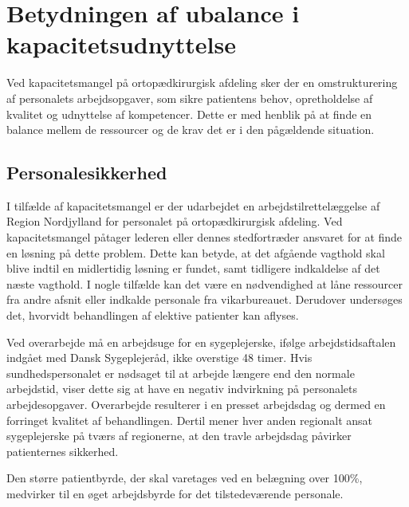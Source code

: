 \section{Betydningen af ubalance i kapacitetsudnyttelse}
Ved kapacitetsmangel på ortopædkirurgisk afdeling sker der en omstrukturering af personalets arbejdsopgaver, som sikre patientens behov, opretholdelse af kvalitet og udnyttelse af kompetencer. Dette er med henblik på at finde en balance mellem de ressourcer og de krav det er i den pågældende situation. \cite{Bjerg2016}  %

\subsection{Personalesikkerhed} \label{Per_sik}

I tilfælde af kapacitetsmangel er der udarbejdet en arbejdstilrettelæggelse af Region Nordjylland for personalet på ortopædkirurgisk afdeling. Ved kapacitetsmangel påtager lederen eller dennes stedfortræder ansvaret for at finde en løsning på dette problem. Dette kan betyde, at det afgående vagthold skal blive indtil en midlertidig løsning er fundet, samt  tidligere indkaldelse af det næste vagthold. I nogle tilfælde kan det være en nødvendighed at låne ressourcer fra andre afsnit eller indkalde personale fra vikarbureauet. Derudover undersøges det, hvorvidt behandlingen af elektive patienter kan aflyses.\cite{Bjerg2016} 

Ved overarbejde må en arbejdsuge for en sygeplejerske, ifølge arbejdstidsaftalen indgået med Dansk Sygeplejeråd, ikke overstige 48 timer\cite{Danske2015}.  Hvis sundhedspersonalet er nødsaget til at arbejde længere end den normale arbejdstid, viser dette sig at have en negativ indvirkning på personalets arbejdesopgaver.\cite{Dinges2004} Overarbejde resulterer i en presset arbejdsdag og dermed en forringet kvalitet af behandlingen. Dertil mener hver anden regionalt ansat sygeplejerske på tværs af regionerne, at den travle arbejdsdag påvirker patienternes sikkerhed.\cite{Kjeldsen2015} 

Den større patientbyrde, der skal varetages ved en belægning over 100\%, medvirker til en øget arbejdsbyrde for det tilstedeværende personale. \cite{Dinges2004,Aiken2002,Madsen2014}


